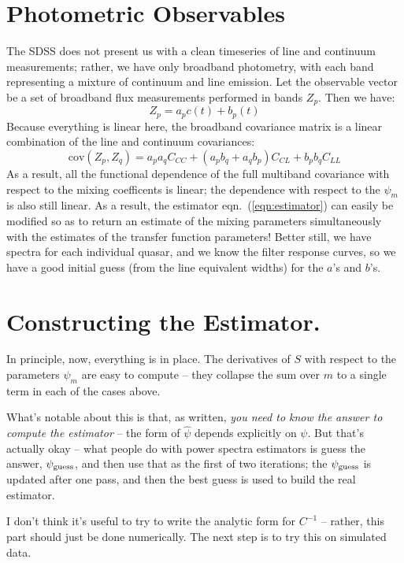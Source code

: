 \documentclass[11pt,a4paper]{article}
\begin{document}
\section{Photometric Observables}
The SDSS does not present us with a clean timeseries of line and
continuum measurements; rather, we have only broadband photometry,
with each band representing a mixture of continuum and line
emission. Let the observable vector be a set of broadband flux
measurements performed in bands $Z_p$. Then we have:
\begin{equation}
  Z_p = a_p c\left(t\right) + b_p \left(t\right)
\end{equation}
Because everything is linear here, the broadband covariance matrix is
a linear combination of the line and continuum covariances:
\begin{equation}
\mathrm{cov}(Z_p,Z_q)= a_pa_qC_{CC}+(a_pb_q +a_qb_p)C_{CL} + b_pb_qC_{LL}
\end{equation}
As a result, all the functional dependence of the full multiband
covariance with respect to the mixing coefficents is linear; the
dependence with respect to the $\psi_m$ is also still linear. As a
result, the estimator eqn.~(\ref{eqn:estimator}) can easily be
modified so as to return an estimate of the mixing parameters
simultaneously with the estimates of the transfer function parameters!
Better still, we have spectra for each individual quasar, and we know
the filter response curves, so we have a good initial guess (from the
line equivalent widths) for the $a$'s and $b$'s.


\section{Constructing the Estimator.}
In principle, now, everything is in place. The derivatives of $S$ with
respect to the parameters $\psi_m$ are easy to compute -- they
collapse the sum over $m$ to a single term in each of the cases
above. 

What's notable about this is that, as written, {\it you need to know
  the answer to compute the estimator} -- the form of $\hat{\psi}$
depends explicitly on $\psi$. But that's actually okay -- what people
do with power spectra estimators is guess the answer, $\psi_{\rm
  guess}$, and then use that as the first of two iterations; the
$\psi_{\rm guess}$ is updated after one pass, and then the best guess
is used to build the real estimator.

I don't think it's useful to try to write the analytic form for
$C^{-1}$ -- rather, this part should just be done numerically. The
next step is to try this on simulated data.
\end{document}
